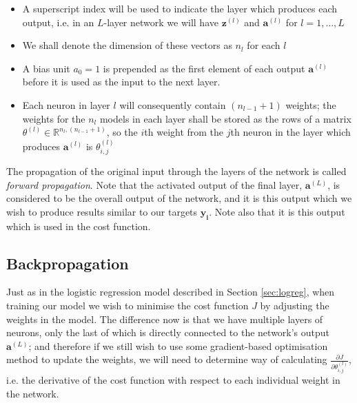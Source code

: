 \documentclass{article}[11pt]
\begin{document}
        \begin{itemize}
            
            \item A superscript index will be used to indicate the layer which produces each output, i.e. in an $L$-layer network we will have $\mathbf{z}^{(l)}$ and $\mathbf{a}^{(l)}$ for $l = 1, \ldots, L$
            
            \item We shall denote the dimension of these vectors as $n_l$ for each $l$
            
            \item A bias unit $a_0 = 1$ is prepended as the first element of each output $\mathbf{a}^{(l)}$ before it is used as the input to the next layer.
            
            \item Each neuron in layer $l$ will consequently contain $(n_{l-1} + 1)$ weights; the weights for the $n_l$ models in each layer shall be stored as the rows of a matrix $\theta^{(l)} \in \mathbb{R}^{n_l, (n_{l-1}+1)}$, so the $i$th weight from the $j$th neuron in the layer which produces $\mathbf{a}^{(l)}$ is $\theta^{(l)}_{i,j}$
        
        \end{itemize}
        
        The propagation of the original input through the layers of the network is called \textit{forward propagation}. Note that the activated output of the final layer, $\mathbf{a}^{(L)}$, is considered to be the overall output of the network, and it is this output which we wish to produce results similar to our targets $\mathbf{y_i}$. Note also that it is this output which is used in the cost function.
        
        
        

    \subsection{Backpropagation}
        
        Just as in the logistic regression model described in Section \ref{sec:logreg}, when training our model we wish to minimise the cost function $J$ by adjusting the weights in the model. The difference now is that we have multiple layers of neurons, only the last of which is directly connected to the network's output $\mathbf{a}^{(L)}$; and therefore if we still wish to use some gradient-based optimisation method to update the weights, we will need to determine way of calculating $\frac{\partial J}{\partial \theta^{(l)}_{i,j}}$, i.e. the derivative of the cost function with respect to each individual weight in the network.
        
\end{document}
